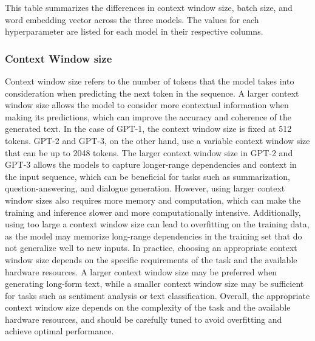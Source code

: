 \documentclass[
	11pt,
	a4paper,
	figtabcapt,
]{oblivoir}
\begin{document}
This table summarizes the differences in context window size, batch size, and word embedding vector across the three models. The values for each hyperparameter are listed for each model in their respective columns.

\subsubsection{Context Window size}
Context window size refers to the number of tokens that the model takes into consideration when predicting the next token in the sequence. A larger context window size allows the model to consider more contextual information when making its predictions, which can improve the accuracy and coherence of the generated text.
In the case of GPT-1, the context window size is fixed at 512 tokens. GPT-2 and GPT-3, on the other hand, use a variable context window size that can be up to 2048 tokens. The larger context window size in GPT-2 and GPT-3 allows the models to capture longer-range dependencies and context in the input sequence, which can be beneficial for tasks such as summarization, question-answering, and dialogue generation.
However, using larger context window sizes also requires more memory and computation, which can make the training and inference slower and more computationally intensive. Additionally, using too large a context window size can lead to overfitting on the training data, as the model may memorize long-range dependencies in the training set that do not generalize well to new inputs.
In practice, choosing an appropriate context window size depends on the specific requirements of the task and the available hardware resources. A larger context window size may be preferred when generating long-form text, while a smaller context window size may be sufficient for tasks such as sentiment analysis or text classification.
Overall, the appropriate context window size depends on the complexity of the task and the available hardware resources, and should be carefully tuned to avoid overfitting and achieve optimal performance.
\end{document}
